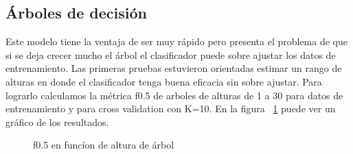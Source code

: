 \subsection{Árboles de decisión}

Este modelo tiene la ventaja de ser muy rápido pero presenta el problema de que si se deja crecer mucho el árbol el clasificador puede sobre ajustar los datos de entrenamiento. Las primeras pruebas estuvieron orientadas estimar un rango de alturas en donde el clasificador tenga buena eficacia sin sobre ajustar. Para lograrlo calculamos la métrica  f0.5 de arboles de alturas de 1 a 30 para datos de entrenamiento y para cross validation con K=10. En la figura ~\ref{fig:arboles_f05_en_funcion_altura} puede ver un gráfico de los resultados.

\begin{figure}[H]
    \centering
        \caption{f0.5 en funcíon de altura de árbol}
        \label{fig:arboles_f05_en_funcion_altura}
\end{figure}

